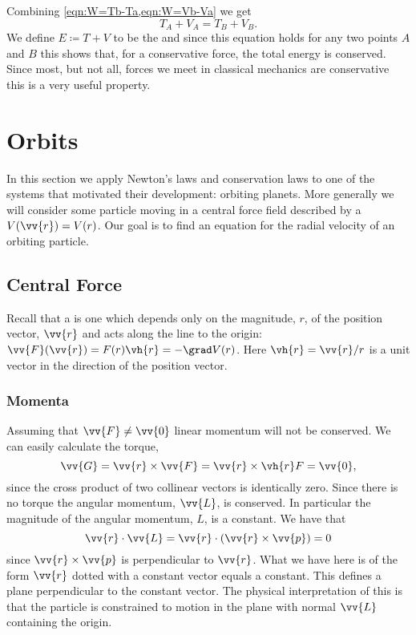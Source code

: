 \documentclass[fleqn]{NotesClass}
\begin{document}
    Combining \cref{eqn:W=Tb-Ta,eqn:W=Vb-Va} we get
    \begin{equation}
        T_A + V_A = T_B + V_B.
    \end{equation}
    We define \(E \coloneqq T + V\) to be the  and since this equation holds for any two points \(A\) and \(B\) this shows that, for a conservative force, the total energy is conserved.
    Since most, but not all, forces we meet in classical mechanics are conservative this is a very useful property.
    
    \chapter{Orbits}
    In this section we apply Newton's laws and conservation laws to one of the systems that motivated their development: orbiting planets.
    More generally we will consider some particle moving in a central force field described by a  \(V(\vv{r}) = V(r)\).
    Our goal is to find an equation for the radial velocity of an orbiting particle.
    
    \section{Central Force}
    Recall that a  is one which depends only on the magnitude, \(r\), of the position vector, \(\vv{r}\) and acts along the line to the origin: \(\vv{F}(\vv{r}) = F(r)\vh{r} = -\grad V(r)\).
    Here \(\vh{r} = \vv{r}/r\) is a unit vector in the direction of the position vector.
    
    \subsection{Momenta}
    Assuming that \(\vv{F} \ne \vv{0}\) linear momentum will not be conserved.
    We can easily calculate the torque,
    \begin{equation}
        \vv{G} = \vv{r}\times\vv{F} = \vv{r}\times\vh{r}F = \vv{0},
    \end{equation}
    since the cross product of two collinear vectors is identically zero.
    Since there is no torque the angular momentum, \(\vv{L}\), is conserved.
    In particular the magnitude of the angular momentum, \(L\), is a constant.
    We have that
    \begin{equation}
        \vv{r}\cdot\vv{L} = \vv{r}\cdot(\vv{r}\times\vv{p}) = 0
    \end{equation}
    since \(\vv{r}\times\vv{p}\) is perpendicular to \(\vv{r}\).
    What we have here is of the form \(\vv{r}\) dotted with a constant vector equals a constant.
    This defines a plane perpendicular to the constant vector.
    The physical interpretation of this is that the particle is constrained to motion in the plane with normal \(\vv{L}\) containing the origin.
    
\end{document}
